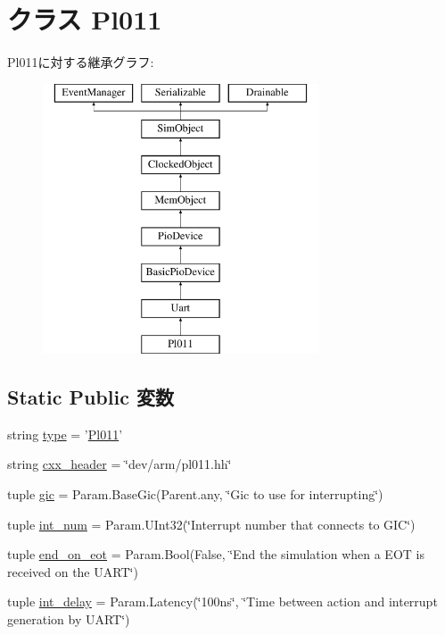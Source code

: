 \hypertarget{classRealView_1_1Pl011}{
\section{クラス Pl011}
\label{classRealView_1_1Pl011}
}
Pl011に対する継承グラフ:\begin{figure}[H]
\begin{center}
\leavevmode
\includegraphics[height=8cm]{classRealView_1_1Pl011}
\end{center}
\end{figure}
\subsection*{Static Public 変数}
\begin{DoxyCompactItemize}
\item 
string \hyperlink{classRealView_1_1Pl011_acce15679d830831b0bbe8ebc2a60b2ca}{type} = '\hyperlink{classRealView_1_1Pl011}{Pl011}'
\item 
string \hyperlink{classRealView_1_1Pl011_a17da7064bc5c518791f0c891eff05fda}{cxx\_\-header} = \char`\"{}dev/arm/pl011.hh\char`\"{}
\item 
tuple \hyperlink{classRealView_1_1Pl011_a40243beb62d217c3a9e35801ae739fd0}{gic} = Param.BaseGic(Parent.any, \char`\"{}Gic to use for interrupting\char`\"{})
\item 
tuple \hyperlink{classRealView_1_1Pl011_a65fded6db751c1b9aa7168b29056e819}{int\_\-num} = Param.UInt32(\char`\"{}Interrupt number that connects to GIC\char`\"{})
\item 
tuple \hyperlink{classRealView_1_1Pl011_a8a06d20e8aa2c0d9c546230a08d059c7}{end\_\-on\_\-eot} = Param.Bool(False, \char`\"{}End the simulation when a EOT is received on the UART\char`\"{})
\item 
tuple \hyperlink{classRealView_1_1Pl011_a849551e71f91ca939d22d4c083f4c731}{int\_\-delay} = Param.Latency(\char`\"{}100ns\char`\"{}, \char`\"{}Time between action and interrupt generation by UART\char`\"{})
\end{DoxyCompactItemize}


